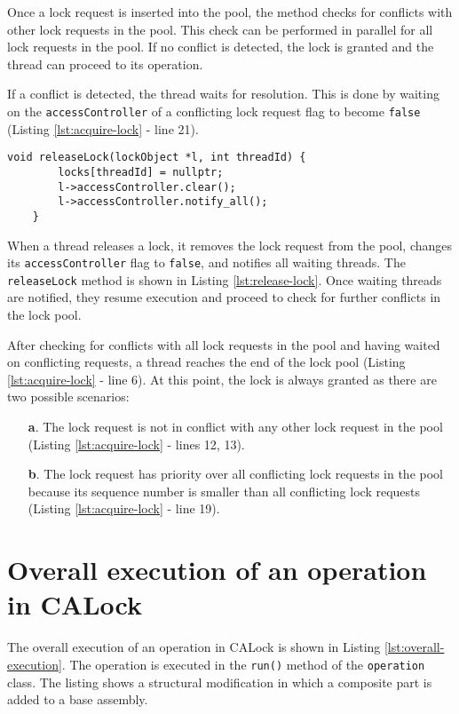 Once a lock request is inserted into the pool, the method checks for conflicts with other lock requests in the pool. This check can be performed in parallel for all lock requests in the pool. If no conflict is detected, the lock is granted and the thread can proceed to its operation.

If a conflict is detected, the thread waits for resolution. This is done by waiting on the \texttt{accessController} of a conflicting lock request flag to become \texttt{false} (Listing \ref{lst:acquire-lock} - line 21).  

\begin{lstlisting}[caption={Releasing a lock}, label={lst:release-lock}]
    void releaseLock(lockObject *l, int threadId) {
        locks[threadId] = nullptr;
        l->accessController.clear();
        l->accessController.notify_all();
    }
\end{lstlisting}

When a thread releases a lock, it removes the lock request from the pool, changes its \texttt{accessController} flag to \texttt{false}, and notifies all waiting threads. The \texttt{releaseLock} method is shown in Listing \ref{lst:release-lock}. Once waiting threads are notified, they resume execution and proceed to check for further conflicts in the lock pool.


After checking for conflicts with all lock requests in the pool and having waited on conflicting requests, a thread reaches the end of the lock pool (Listing \ref{lst:acquire-lock} - line 6). At this point, the lock is always granted as there are two possible scenarios:

\begin{enumerate}
    \item[\textbf{a}.] The lock request is not in conflict with any other lock request in the pool (Listing \ref{lst:acquire-lock} - lines 12, 13).
    \item[\textbf{b}.] The lock request has priority over all conflicting lock requests in the pool because its sequence number is smaller than all conflicting lock requests (Listing \ref{lst:acquire-lock} - line 19). 
\end{enumerate}



\section{Overall execution of an operation in CALock}

The overall execution of an operation in CALock is shown in Listing \ref{lst:overall-execution}. The operation is executed in the \texttt{run()} method of the \texttt{operation} class. The listing shows a structural modification in which a composite part is added to a base assembly.

